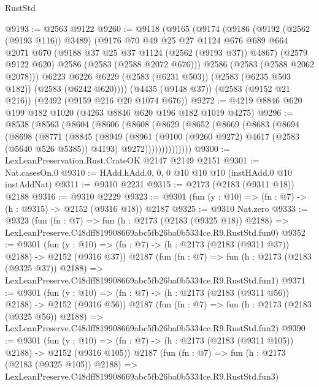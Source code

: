 \begin{lexlean}{RustStd}
\begin{coremodule}
@9193 := @2563 @9122
@9260 := @9118
    (@9165
      (@9174
        (@9186
          (@9192 (@2562 (@9193 @116)) @3489)
          (@9176
            @70
            @49
            @25
            @27
            @1124
            @676
            @689
            @664
            @2071
            @670
            (@9188 @37 @25 @37 @1124 (@2562 (@9193 @37)) @4867)
            (@2579 @9122 @620)
            @2586
            (@2583 (@2588 @2072 @676)))
          @2586
          (@2583 (@2588 @2062 @2078)))
        @6223
        @6226
        @6229
        (@2583 (@6231 @503))
        (@2583 (@6235 @503 @182))
        (@2583 (@6242 @620))))
    (@4435 (@9148 @37))
    (@2583 (@9152 @21 @216))
    (@2492 (@9159 @216 @20 @1074 @676))
@9272 := @4219 @8846 @620 @199 @182 @1020 (@4263 @8846 @620 @196 @182 @1019 @4275)
@9296 := @8538
    (@8563
      (@8604
        (@8606
          (@8608
            (@8629
              (@8652
                (@8669
                  (@8683
                    (@8694
                      (@8698
                        (@8771
                          (@8845
                            (@8949
                              (@8961
                                (@9100 (@9260 @9272) @4617 (@2583 (@5640 @526 @5385)) @4193)
                                @9272))))))))))))))
@9300 := LexLeanPreservation.Rust.CrateOK @2147 @2149 @2151
@9301 := Nat.casesOn.{0}
@9310 := HAdd.hAdd.{0, 0, 0} @10 @10 @10 (instHAdd.{0} @10 instAddNat)
@9311 := @9310 @2231
@9315 := @2173 (@2183 (@9311 @18)) @2188
@9316 := @9310 @2229
@9323 := @9301 (fun (y : @10) => (fn : @7) -> (h : @9315) -> @2152 (@9316 @18)) @2187
@9325 := @9310 Nat.zero
@9333 := @9323
    (fun (fn : @7) =>
    fun (h : @2173 (@2183 (@9325 @18)) @2188) =>
    LexLeanPreserve.C48dff819908669abc5fb26ba0b5334ce.R9.RustStd.fun0)
@9352 := @9301
    (fun (y : @10) => (fn : @7) -> (h : @2173 (@2183 (@9311 @37)) @2188) -> @2152 (@9316 @37))
    @2187
    (fun (fn : @7) =>
    fun (h : @2173 (@2183 (@9325 @37)) @2188) =>
    LexLeanPreserve.C48dff819908669abc5fb26ba0b5334ce.R9.RustStd.fun1)
@9371 := @9301
    (fun (y : @10) => (fn : @7) -> (h : @2173 (@2183 (@9311 @56)) @2188) -> @2152 (@9316 @56))
    @2187
    (fun (fn : @7) =>
    fun (h : @2173 (@2183 (@9325 @56)) @2188) =>
    LexLeanPreserve.C48dff819908669abc5fb26ba0b5334ce.R9.RustStd.fun2)
@9390 := @9301
    (fun (y : @10) => (fn : @7) -> (h : @2173 (@2183 (@9311 @105)) @2188) -> @2152 (@9316 @105))
    @2187
    (fun (fn : @7) =>
    fun (h : @2173 (@2183 (@9325 @105)) @2188) =>
    LexLeanPreserve.C48dff819908669abc5fb26ba0b5334ce.R9.RustStd.fun3)

\end{coremodule}
\end{lexlean}
